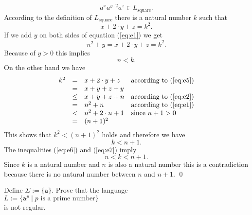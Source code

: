 \[ a^xa^{y\cdot 2}a^z \in L_{\mathrm{square}}.  \]
According to the definition of $L_{\mathrm{square}}$ there is a natural number $k$ such that
\begin{equation}
  \label{eq:e5}
  x + 2\cdot y + z = k^2.
\end{equation}
If we add $y$ on both sides of equation (\ref{eq:e1}) we get
\[ n^2 + y = x + 2\cdot y + z = k^2. \]
Because of $y > 0$ this implies
\begin{equation}
  \label{eq:e6}
  n < k.    
\end{equation}
On the other hand we have
\[ 
\begin{array}[t]{lcll}
 k^2  & =    & x + 2 \cdot y + z       & \mbox{according to (\ref{eq:e5}})   \\
      & =    & x + y + z + y           &                                       \\
      & \leq & x + y + z + n           & \mbox{according to (\ref{eq:e2}}) \\
      & =    & n^2 + n                 & \mbox{according to (\ref{eq:e1}})   \\
      & <    & n^2 + 2 \cdot n + 1     & \mbox{since $n+1 > 0$}                   \\ 
      & =    & (n + 1)^2               
\end{array}
\]
This shows that  $k^2 < (n+1)^2$ holds and therefore we have
\begin{equation}
  \label{eq:e7}
  k < n+1.
\end{equation}
The inequalities (\ref{eq:e6}) and (\ref{eq:e7}) imply
\[ n < k < n + 1. \]
Since $k$ is a natural number and $n$ is also a natural number this is a contradiction because there is no
natural number between  $n$ and $n+1$.
\qed


\exerciseEng
Define $\Sigma := \{\mathtt{a}\}$.  
Prove that the language
\\[0.2cm]
\hspace*{1.3cm}
$L := \bigl\{ \mathtt{a}^p \mid \mbox{$p$ is a prime number} \bigr\}$
\\[0.2cm]
is not regular.  \eox
\vspace{0.3cm}


